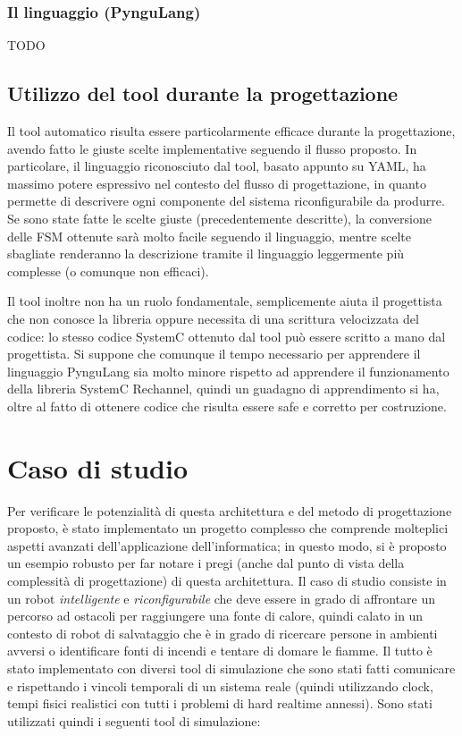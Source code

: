 \documentclass[a4paper,titlepage]{book}
\begin{document}
\subsection{Il linguaggio (PynguLang)}

TODO

\section{Utilizzo del tool durante la progettazione}

Il tool automatico risulta essere particolarmente efficace durante la progettazione, avendo fatto le giuste scelte implementative seguendo il flusso proposto. In particolare, il linguaggio riconosciuto dal tool, basato appunto su YAML, ha massimo potere espressivo nel contesto del flusso di progettazione, in quanto permette di descrivere ogni componente del sistema riconfigurabile da produrre. Se sono state fatte le scelte giuste (precedentemente descritte), la conversione delle FSM ottenute sarà molto facile seguendo il linguaggio, mentre scelte sbagliate renderanno la descrizione tramite il linguaggio leggermente più complesse (o comunque non efficaci).

Il tool inoltre non ha un ruolo fondamentale, semplicemente aiuta il progettista che non conosce la libreria oppure necessita di una scrittura velocizzata del codice: lo stesso codice SystemC ottenuto dal tool può essere scritto a mano dal progettista. Si suppone che comunque il tempo necessario per apprendere il linguaggio PynguLang sia molto minore rispetto ad apprendere il funzionamento della libreria SystemC Rechannel, quindi un guadagno di apprendimento si ha, oltre al fatto di ottenere codice che risulta essere safe e corretto per costruzione.



\chapter{Caso di studio}

Per verificare le potenzialità di questa architettura e del metodo di progettazione proposto, è stato implementato un progetto complesso che comprende molteplici aspetti avanzati dell'applicazione dell'informatica; in questo modo, si è proposto un esempio robusto per far notare i pregi (anche dal punto di vista della complessità di progettazione) di questa architettura.
Il caso di studio consiste in un robot \textit{intelligente} e \textit{riconfigurabile} che deve essere in grado di affrontare un percorso ad ostacoli per raggiungere una fonte di calore, quindi calato in un contesto di robot di salvataggio che è in grado di ricercare persone in ambienti avversi o identificare fonti di incendi e tentare di domare le fiamme. Il tutto è stato implementato con diversi tool di simulazione che sono stati fatti comunicare e rispettando i vincoli temporali di un sistema reale (quindi utilizzando clock, tempi fisici realistici con tutti i problemi di hard realtime annessi).
Sono stati utilizzati quindi i seguenti tool di simulazione:
\end{document}
